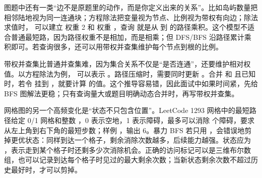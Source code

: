 图题中还有一类“边不是原题里的动作，而是你定义出来的关系”。比如岛屿数量把相邻陆地视为同一连通块；方程除法把变量视为节点、比例视为带权有向边；除法求值时， 可以建立  权重 2 和  权重 ，查询  就是从  到  的路径乘积。这个模型不适合普通最短路，因为路径权重不是相加，而是相乘；但 DFS/BFS 沿路径累计乘积即可。若查询很多，还可以用带权并查集维护每个节点到根的比例。

带权并查集比普通并查集难，因为集合关系不仅是“是否连通”，还要维护相对权值。以方程除法为例， 可以表示 。路径压缩时，需要同时更新 。合并  和  且已知  时，若令  挂到 ，就要计算  的值。这个推导容易错，因此面试中如果时间紧，先给 BFS 图解法更稳；只有查询量大或题目明确动态合并时，再写带权并查集。

网格图的另一个高频变化是“状态不只包含位置”。LeetCode 1293 网格中的最短路径给定 0/1 网格和整数 ，0 表示空地，1 表示障碍，最多可以消除  个障碍，要求从左上角到右下角的最短步数；样例 ，输出 6。暴力 BFS 若只用 ，会错误地剪掉更优状态：同样到达一个格子，剩余消除次数越多，后续能力越强。状态应为 ，表示走到某个格子时还剩多少次消除机会。正确的访问标记可以是三维布尔数组，也可以记录到达每个格子时见过的最大剩余次数；当新状态剩余次数不超过历史最好时，才可以剪掉。

